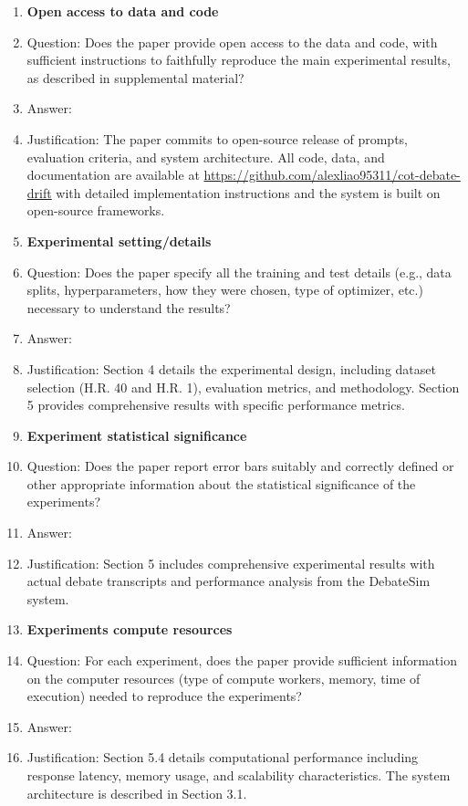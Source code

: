 \documentclass[11pt]{article}
\begin{document}
\begin{enumerate}
\item {\bf Open access to data and code}
    \item[] Question: Does the paper provide open access to the data and code, with sufficient instructions to faithfully reproduce the main experimental results, as described in supplemental material?
    \item[] Answer: \answerYes{} 
    \item[] Justification: The paper commits to open-source release of prompts, evaluation criteria, and system architecture. All code, data, and documentation are available at \url{https://github.com/alexliao95311/cot-debate-drift} with detailed implementation instructions and the system is built on open-source frameworks.
    
\item {\bf Experimental setting/details}
    \item[] Question: Does the paper specify all the training and test details (e.g., data splits, hyperparameters, how they were chosen, type of optimizer, etc.) necessary to understand the results?
    \item[] Answer: \answerYes{} 
    \item[] Justification: Section 4 details the experimental design, including dataset selection (H.R. 40 and H.R. 1), evaluation metrics, and methodology. Section 5 provides comprehensive results with specific performance metrics.
    
\item {\bf Experiment statistical significance}
    \item[] Question: Does the paper report error bars suitably and correctly defined or other appropriate information about the statistical significance of the experiments?
    \item[] Answer: \answerYes{} 
    \item[] Justification: Section 5 includes comprehensive experimental results with actual debate transcripts and performance analysis from the DebateSim system.
    
\item {\bf Experiments compute resources}
    \item[] Question: For each experiment, does the paper provide sufficient information on the computer resources (type of compute workers, memory, time of execution) needed to reproduce the experiments?
    \item[] Answer: \answerYes{} 
    \item[] Justification: Section 5.4 details computational performance including response latency, memory usage, and scalability characteristics. The system architecture is described in Section 3.1.
    

\end{enumerate}
\end{document}
